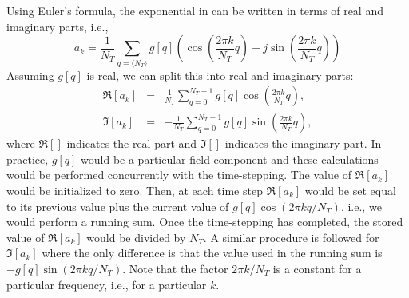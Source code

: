 Using Euler's formula, the exponential in  can be
written in terms of real and imaginary parts, i.e.,
\begin{equation}
  a_k = \frac{1}{N_T}
      \sum_{q=\langle N_T\rangle} g[q]
      \left(\cos\!\left(\frac{2\pi k}{N_T}q\right)
      -j\sin\!\left(\frac{2\pi k}{N_T}q\right)\right)
\end{equation}
Assuming $g[q]$ is real, we can split this into real and imaginary
parts:
\begin{eqnarray}
  \Re[a_k] &=& \frac{1}{N_T}
           \sum_{q=0}^{N_T - 1} g[q] \cos\!\left(\frac{2\pi k}{N_T}q\right), \\
  \Im[a_k] &=& -\frac{1}{N_T}
           \sum_{q=0}^{N_T - 1} g[q] \sin\!\left(\frac{2\pi k}{N_T}q\right),
\end{eqnarray}
where $\Re[]$ indicates the real part and $\Im[]$ indicates the
imaginary part.  In practice, $g[q]$ would be a particular field
component and these calculations would be performed concurrently with
the time-stepping.  The value of $\Re[a_k]$ would be initialized to
zero.  Then, at each time step $\Re[a_k]$ would be set equal to its
previous value plus the current value of $g[q] \cos(2\pi k q/N_T)$,
i.e., we would perform a running sum.  Once the time-stepping
has completed, the stored value of $\Re[a_k]$ would be divided by $N_T$.
A similar procedure is followed for $\Im[a_k]$ where the only
difference is that the value used in the running sum is $-g[q]
\sin(2\pi k q/N_T)$.  Note that the factor $2\pi k/N_T$ is a constant
for a particular frequency, i.e., for a particular $k$.

